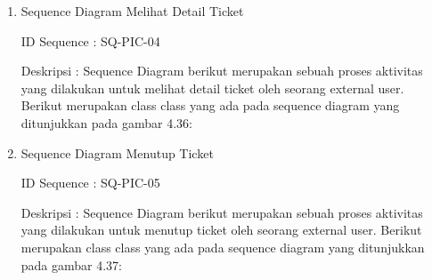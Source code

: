 \documentclass[12pt]{article}
\begin{document}
\begin{enumerate}[label=\textbf{4.\arabic*.}]
\begin{enumerate}[label=\textbf{4.1.\arabic*.}, wide, labelwidth=!, labelindent=0pt]
\begin{enumerate}[label=\textbf{4.1.7.\arabic*.}, wide, labelwidth=!, labelindent=0pt]
\begin{enumerate}[label=\arabic*.]
                
                \item Sequence Diagram Melihat Detail Ticket
                
                \noindent ID Sequence	: SQ-PIC-04
                
                \noindent Deskripsi	: Sequence Diagram berikut merupakan sebuah proses aktivitas yang dilakukan untuk melihat detail ticket oleh seorang external user. Berikut merupakan class class yang ada pada sequence diagram yang ditunjukkan pada gambar 4.36:
                
                
                \item Sequence Diagram Menutup Ticket
                
                \noindent ID Sequence	: SQ-PIC-05
                
                \noindent Deskripsi	: Sequence Diagram berikut merupakan sebuah proses aktivitas yang dilakukan untuk menutup ticket oleh seorang external user. Berikut merupakan class class yang ada pada sequence diagram yang ditunjukkan pada gambar 4.37:
                
                

\end{enumerate}
\end{enumerate}
\end{enumerate}
\end{enumerate}
\end{document}
